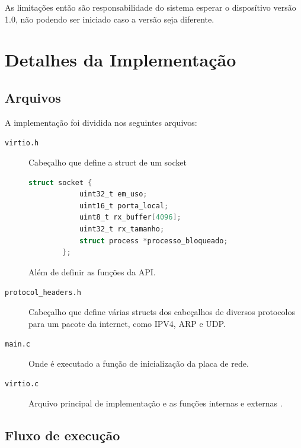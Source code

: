 As limitações então são responsabilidade do sistema esperar o disposítivo versão 1.0, não podendo ser iniciado caso a versão seja diferente. \cite{virtio:networkdevice}



\section{Detalhes da Implementação}
%
%

\subsection{Arquivos}

A implementação foi dividida nos seguintes arquivos:

\begin{description}
    \item[\texttt{virtio.h}] Cabeçalho que define a struct de um socket
    \begin{lstlisting}[language=C]
        struct socket {
            uint32_t em_uso;
            uint16_t porta_local;
            uint8_t rx_buffer[4096];
            uint32_t rx_tamanho;
            struct process *processo_bloqueado;
        };
    \end{lstlisting}
    Além de definir as funções da API.

    \item[\texttt{protocol\_headers.h}] Cabeçalho que define várias structs dos cabeçalhos de diversos protocolos para um pacote da internet, como IPV4, ARP e UDP.

    \item[\texttt{main.c}] Onde é executado a função de inicialização da placa de rede.

    \item[\texttt{virtio.c}] Arquivo principal de implementação e as funções internas e externas .
\end{description}

\subsection{Fluxo de execução}


